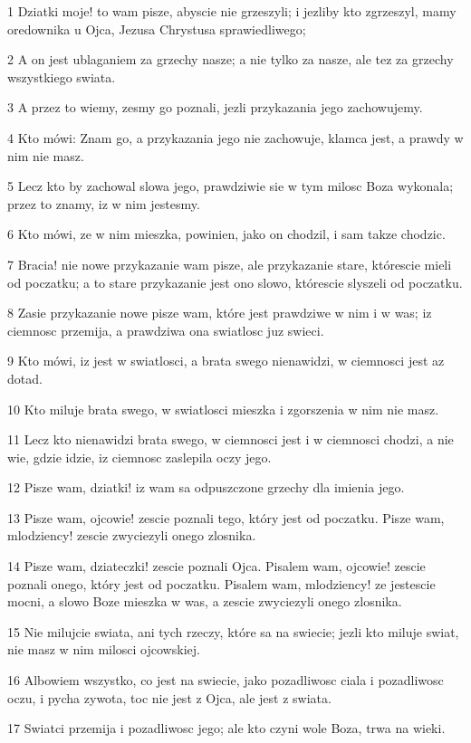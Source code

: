 \par 1 Dziatki moje! to wam pisze, abyscie nie grzeszyli; i jezliby kto zgrzeszyl, mamy oredownika u Ojca, Jezusa Chrystusa sprawiedliwego;
\par 2 A on jest ublaganiem za grzechy nasze; a nie tylko za nasze, ale tez za grzechy wszystkiego swiata.
\par 3 A przez to wiemy, zesmy go poznali, jezli przykazania jego zachowujemy.
\par 4 Kto mówi: Znam go, a przykazania jego nie zachowuje, klamca jest, a prawdy w nim nie masz.
\par 5 Lecz kto by zachowal slowa jego, prawdziwie sie w tym milosc Boza wykonala; przez to znamy, iz w nim jestesmy.
\par 6 Kto mówi, ze w nim mieszka, powinien, jako on chodzil, i sam takze chodzic.
\par 7 Bracia! nie nowe przykazanie wam pisze, ale przykazanie stare, którescie mieli od poczatku; a to stare przykazanie jest ono slowo, którescie slyszeli od poczatku.
\par 8 Zasie przykazanie nowe pisze wam, które jest prawdziwe w nim i w was; iz ciemnosc przemija, a prawdziwa ona swiatlosc juz swieci.
\par 9 Kto mówi, iz jest w swiatlosci, a brata swego nienawidzi, w ciemnosci jest az dotad.
\par 10 Kto miluje brata swego, w swiatlosci mieszka i zgorszenia w nim nie masz.
\par 11 Lecz kto nienawidzi brata swego, w ciemnosci jest i w ciemnosci chodzi, a nie wie, gdzie idzie, iz ciemnosc zaslepila oczy jego.
\par 12 Pisze wam, dziatki! iz wam sa odpuszczone grzechy dla imienia jego.
\par 13 Pisze wam, ojcowie! zescie poznali tego, który jest od poczatku. Pisze wam, mlodziency! zescie zwyciezyli onego zlosnika.
\par 14 Pisze wam, dziateczki! zescie poznali Ojca. Pisalem wam, ojcowie! zescie poznali onego, który jest od poczatku. Pisalem wam, mlodziency! ze jestescie mocni, a slowo Boze mieszka w was, a zescie zwyciezyli onego zlosnika.
\par 15 Nie milujcie swiata, ani tych rzeczy, które sa na swiecie; jezli kto miluje swiat, nie masz w nim milosci ojcowskiej.
\par 16 Albowiem wszystko, co jest na swiecie, jako pozadliwosc ciala i pozadliwosc oczu, i pycha zywota, toc nie jest z Ojca, ale jest z swiata.
\par 17 Swiatci przemija i pozadliwosc jego; ale kto czyni wole Boza, trwa na wieki.
